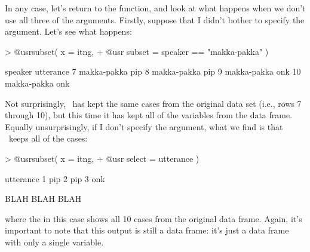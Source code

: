 In any case, let's return to the  function, and look at what happens when we don't use all three of the arguments. Firstly, suppose that I didn't bother to specify the  argument. Let's see what happens:
\begin{rblock1}
> @usr{subset( x = itng,}
+ @usr{        subset = speaker == "makka-pakka" )}

       speaker utterance
7  makka-pakka       pip
8  makka-pakka       pip
9  makka-pakka       onk
10 makka-pakka       onk
\end{rblock1}
Not surprisingly, \R\ has kept the same cases from the original data set (i.e., rows 7 through 10), but this time it has kept all of the variables from the data frame. Equally unsurprisingly, if I don't specify the  argument, what we find is that \R\ keeps all of the cases:
\begin{rblock1}
> @usr{subset( x = itng,} 
+ @usr{        select = utterance )}

   utterance
1        pip
2        pip
3        onk

BLAH BLAH BLAH
\end{rblock1}
where the  in this case shows all 10 cases from the original  data frame. Again, it's important to note that this output is still a data frame: it's just a data frame with only a single variable. 




